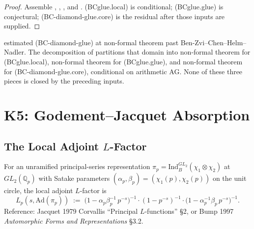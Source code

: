 \begin{proof}
Assemble ,
,
, and
.
(BCglue.local) is conditional; (BCglue.glue) is conjectural;
(BC-diamond-glue.core) is the residual after those inputs are supplied.
\end{proof}

\begin{remark}
\label{v4-arith:bcglue-k5:rem:domain-delta}
 estimated
(BC-diamond-glue) at non-formal theorem past Ben-Zvi--Chen--Helm--Nadler.
The decomposition of 
partitions that domain into non-formal theorem for (BCglue.local), non-formal theorem
for (BCglue.glue), and non-formal theorem for (BC-diamond-glue.core),
conditional on arithmetic AG. None of these three pieces is closed
by the preceding inputs.
\end{remark}

\section{K5: Godement--Jacquet Absorption}
\label{v4-arith:bcglue-k5:K5}

\subsection{The Local Adjoint \(L\)-Factor}

\begin{definition}
\label{v4-arith:bcglue-k5:def:adjoint-L}
For an unramified principal-series representation
\(\pi_{p}=\mathrm{Ind}_{B}^{GL_{2}}(\chi_{1}\otimes\chi_{2})\) at
\(GL_{2}(\mathbb{Q}_{p})\) with Satake parameters
\((\alpha_{p},\beta_{p})=(\chi_{1}(p),\chi_{2}(p))\) on the unit
circle, the local adjoint \(L\)-factor is
\begin{equation}
\label{v4-arith:bcglue-k5:eq:adjoint-L}
L_{p}(s,\mathrm{Ad}(\pi_{p}))
\;:=\;\bigl(1-\alpha_{p}\beta_{p}^{-1}\,p^{-s}\bigr)^{-1}
\cdot(1-p^{-s})^{-1}
\cdot\bigl(1-\alpha_{p}^{-1}\beta_{p}\,p^{-s}\bigr)^{-1}.
\end{equation}
Reference: Jacquet 1979 Corvallis ``Principal \(L\)-functions'' \S2,
or Bump 1997 \emph{Automorphic Forms and Representations} \S3.2.
\end{definition}

